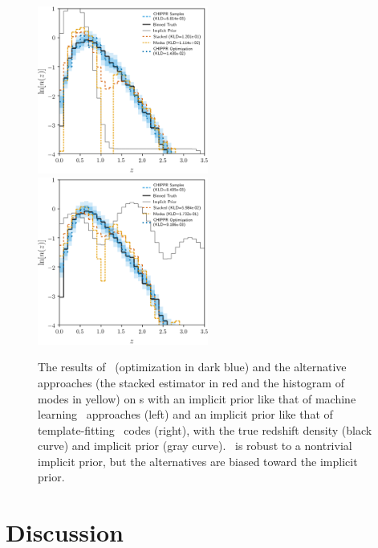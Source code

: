 \begin{figure}
	\includegraphics[width=0.5\textwidth]{figures/chippr/results_trpr.png}
	\includegraphics[width=0.5\textwidth]{figures/chippr/results_tmpr.png}
	\caption{
		The results of \Chippr\ (optimization in dark blue) and the alternative approaches (the stacked estimator in red and the histogram of modes in yellow) on \pzpdf s with an implicit prior like that of machine learning \pzpdf\ approaches (left) and an implicit prior like that of template-fitting \pzpdf\ codes (right), with the true redshift density (black curve) and implicit prior (gray curve).
		\Chippr\ is robust to a nontrivial implicit prior, but the alternatives are biased toward the implicit prior.
	}
\end{figure}

\section{Discussion}


